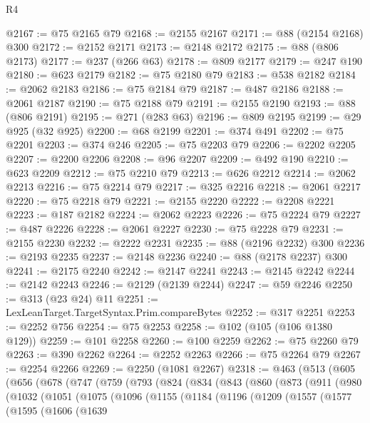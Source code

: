 \begin{lexlean}{R4}
\begin{coremodule}
{{{{{{{{{{{{{{{{{{{{{{{{{{{{{{{{{{{{{{{{{{{{{{{{{{{{{{{{{{{{{{{{{{{{{{{{{{{{{{{{{{{{{{{{{{{{@2167 := @75 @2165 @79
@2168 := @2155 @2167
@2171 := @88 (@2154 @2168) @300
@2172 := @2152 @2171
@2173 := @2148 @2172
@2175 := @88 (@806 @2173)
@2177 := @237 (@266 @63)
@2178 := @809 @2177
@2179 := @247 @190
@2180 := @623 @2179
@2182 := @75 @2180 @79
@2183 := @538 @2182
@2184 := @2062 @2183
@2186 := @75 @2184 @79
@2187 := @487 @2186
@2188 := @2061 @2187
@2190 := @75 @2188 @79
@2191 := @2155 @2190
@2193 := @88 (@806 @2191)
@2195 := @271 (@283 @63)
@2196 := @809 @2195
@2199 := @29 @925 (@32 @925)
@2200 := @68 @2199
@2201 := @374 @491
@2202 := @75 @2201
@2203 := @374 @246
@2205 := @75 @2203 @79
@2206 := @2202 @2205
@2207 := @2200 @2206
@2208 := @96 @2207
@2209 := @492 @190
@2210 := @623 @2209
@2212 := @75 @2210 @79
@2213 := @626 @2212
@2214 := @2062 @2213
@2216 := @75 @2214 @79
@2217 := @325 @2216
@2218 := @2061 @2217
@2220 := @75 @2218 @79
@2221 := @2155 @2220
@2222 := @2208 @2221
@2223 := @187 @2182
@2224 := @2062 @2223
@2226 := @75 @2224 @79
@2227 := @487 @2226
@2228 := @2061 @2227
@2230 := @75 @2228 @79
@2231 := @2155 @2230
@2232 := @2222 @2231
@2235 := @88 (@2196 @2232) @300
@2236 := @2193 @2235
@2237 := @2148 @2236
@2240 := @88 (@2178 @2237) @300
@2241 := @2175 @2240
@2242 := @2147 @2241
@2243 := @2145 @2242
@2244 := @2142 @2243
@2246 := @2129 (@2139 @2244)
@2247 := @59 @2246
@2250 := @313 (@23 @24) @11
@2251 := LexLeanTarget.TargetSyntax.Prim.compareBytes
@2252 := @317 @2251
@2253 := @2252 @756
@2254 := @75 @2253
@2258 := @102 (@105 (@106 @1380 @129))
@2259 := @101 @2258
@2260 := @100 @2259
@2262 := @75 @2260 @79
@2263 := @390 @2262
@2264 := @2252 @2263
@2266 := @75 @2264 @79
@2267 := @2254 @2266
@2269 := @2250 (@1081 @2267)
@2318 := @463
    (@513
      (@605
        (@656
          (@678
            (@747
              (@759
                (@793
                  (@824
                    (@834
                      (@843
                        (@860
                          (@873
                            (@911
                              (@980
                                (@1032
                                  (@1051
                                    (@1075
                                      (@1096
                                        (@1155
                                          (@1184
                                            (@1196
                                              (@1209
                                                (@1557
                                                  (@1577
                                                    (@1595
                                                      (@1606
                                                        (@1639
}}}}}}}}}}}}}}}}}}}}}}}}}}}}}}}}}}}}}}}}}}}}}}}}}}}}}}}}}}}}}}}}}}}}}}}}}}}}}}}}}}}}}}}}}}}}
\end{coremodule}
\end{lexlean}
